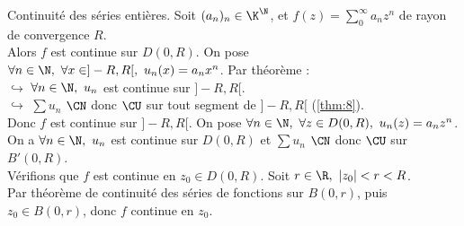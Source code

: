 \documentclass[11pt]{article}
\begin{document}
\vspace*{-0.6cm}

\begin{prop}{Continuité des séries entières.}{}
    Soit $(a_n)_n \in \K^\N$, et $f(z)=\sum_0^\infty a_nz^n$ de rayon de convergence $R$.\\
    Alors $f$ est continue sur $D(0,R)$.
    \tcblower
    \boxed{\R} On pose $\forall n \in \N, ~ \forall x \in ]-R,R[, ~ u_n(x)=a_nx^n$. Par théorème :\\
    $\hookrightarrow$ $\forall n \in \N, ~ u_n$ est continue sur $]-R,R[$.\\
    $\hookrightarrow$ $\sum u_n$ $\CN$ donc $\CU$ sur tout segment de $]-R,R[$ (\ref{thm:8}).\\
    Donc $f$ est continue sur $]-R,R[$.\n
    \boxed{\C} On pose $\forall n \in \N, ~ \forall z \in D(0,R), ~ u_n(z)=a_nz^n$.\\
    On a $\forall n \in \N, ~ u_n$ est continue sur $D(0,R)$ et $\sum u_n$ $\CN$ donc $\CU$ sur $B'(0,R)$.\\
    Vérifions que $f$ est continue en $z_0\in D(0,R)$. Soit $r\in\R,  ~ |z_0| < r < R$.\\
    Par théorème de continuité des séries de fonctions sur $B(0,r)$, puis $z_0\in B(0,r)$, donc $f$ continue en $z_0$.
\end{prop}

\vspace*{-0.6cm}
\end{document}
